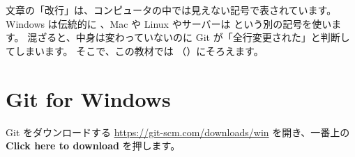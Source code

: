 \begin{why}[改行コードとは]
文章の「改行」は、コンピュータの中では見えない記号で表されています。
Windows は伝統的に 、Mac や Linux やサーバーは  という別の記号を使います。
混ざると、中身は変わっていないのに Git が「全行変更された」と判断してしまいます。
そこで、この教材では （）にそろえます。
\end{why}

\section{Git for Windows}

\begin{step}{Git をダウンロードする}
\url{https://git-scm.com/downloads/win} を開き、一番上の \textbf{Click here to download} を押します。
\end{step}


